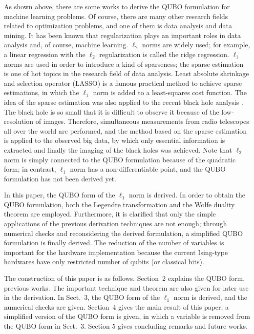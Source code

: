 \documentclass[fp,twocolumn]{jpsj3}
\begin{document}
As shown above, there are some works to derive the QUBO formulation for machine learning problems.
Of course, there are many other research fields related to optimization problems, and one of them is data analysis and data mining.
It has been known that regularization plays an important roles in data analysis and, of course, machine learning.
$\ell_{2}$ norms are widely used; for example, a linear regression with the $\ell_{2}$ regularization is called the ridge regression.
$\ell_{1}$ norms are used in order to introduce a kind of sparseness;
the sparse estimation is one of hot topics in the research field of data analysis.
Least absolute shrinkage and selection operator (LASSO) \cite{lasso} is a famous practical method to achieve sparse estimations, in which the $\ell_{1}$ norm is added to a least-squares cost function.
The idea of the sparse estimation was also applied to the recent black hole analysis \cite{black-hole}.
The black hole is so small that it is difficult to observe it because of the low-resolution of images.
Therefore, simultaneous measurements from radio telescopes all over the world are performed,
and the method based on the sparse estimation is applied to the observed big data, by which only essential information is extracted and finally the imaging of the black holes was achieved.
Note that $\ell_{2}$ norm is simply connected to the QUBO formulation because of the quadratic form; 
in contrast, $\ell_{1}$ norm has a non-differentiable point, and the QUBO formulation has not been derived yet.



In this paper, the QUBO form of the $\ell_{1}$ norm is derived.
In order to obtain the QUBO formulation, both the Legendre transformation and the Wolfe duality theorem are employed.
Furthermore, it is clarified that only the simple applications of the previous derivation techniques are not enough;
through numerical checks and reconsidering the derived formulation, a simplified QUBO formulation is finally derived.
The reduction of the number of variables is important for the hardware implementation 
because the current Ising-type hardwares have only restricted number of qubits (or classical bits).


The construction of this paper is as follows.
Section~2 explains the QUBO form, previous works.
The important technique and theorem are also given for later use in the derivation.
In Sect.~3, the QUBO form of the $\ell_{1}$ norm is derived,
and the numerical checks are given.
Section~4 gives the main result of this paper;
a simplified version of the QUBO form is given,
in which a variable is removed from the QUBO form in Sect.~3.
Section 5 gives concluding remarks and future works.
\end{document}
